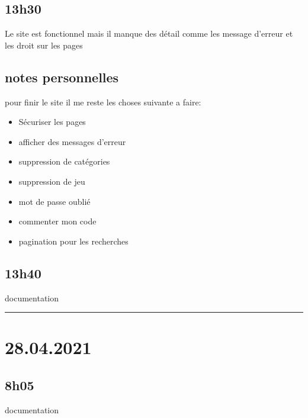 \documentclass[a4paper,12pt,french]{sphinxmanual}
\begin{document}
\subsection{13h30}
\label{\detokenize{logbook:id39}}
\sphinxAtStartPar
Le site est fonctionnel mais il manque des détail comme les message d’erreur et les droit sur les pages


\subsection{notes personnelles}
\label{\detokenize{logbook:id40}}
\sphinxAtStartPar
pour finir le site il me reste les choses suivante a faire:
\begin{itemize}
\item {} 
\sphinxAtStartPar
Sécuriser les pages

\item {} 
\sphinxAtStartPar
afficher des messages d’erreur

\item {} 
\sphinxAtStartPar
suppression de catégories

\item {} 
\sphinxAtStartPar
suppression de jeu

\item {} 
\sphinxAtStartPar
mot de passe oublié

\item {} 
\sphinxAtStartPar
commenter mon code

\item {} 
\sphinxAtStartPar
pagination pour les recherches

\end{itemize}


\subsection{13h40}
\label{\detokenize{logbook:id41}}
\sphinxAtStartPar
documentation


\bigskip\hrule\bigskip



\section{28.04.2021}
\label{\detokenize{logbook:id42}}

\subsection{8h05}
\label{\detokenize{logbook:id43}}
\sphinxAtStartPar
documentation
\end{document}
